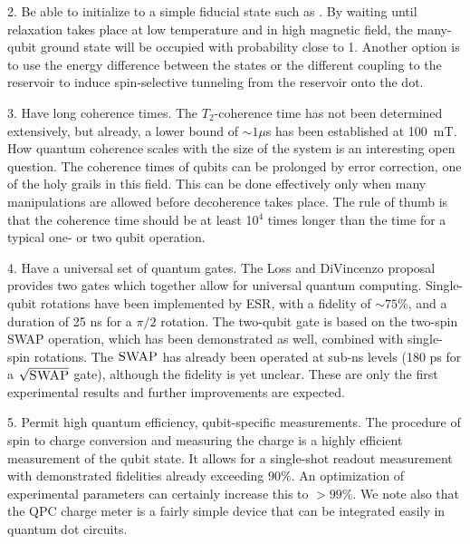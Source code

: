 \documentclass[12pt,aps,nofootinbib]{revtex4-1}
\begin{document}
2. Be able to initialize to a simple fiducial state such as .
By waiting until relaxation takes place at low temperature and in high magnetic field, the many-qubit ground state will be occupied with probability close to 1. Another option is to use the energy difference between the states or the different coupling to the reservoir to induce spin-selective tunneling from the reservoir onto the dot.

3. Have long coherence times. The $T_{2}$-coherence time has not been
determined extensively, but already, a lower bound of $\sim 1 \mu$s has been established at 100~mT. How quantum coherence scales with the size of the system is an interesting open question. The coherence times of qubits can be prolonged by error correction, one of the holy grails in this field. This can be done effectively only when many manipulations are allowed before decoherence takes place. The rule of thumb is that the coherence time should be at least 10$^4$ times longer than the time for a typical one- or two qubit operation.
 
4. Have a universal set of quantum gates. The Loss and DiVincenzo proposal provides two gates which together allow for universal quantum computing. Single-qubit rotations have been implemented by ESR, with a fidelity of $\sim 75\%$, and a duration of 25 ns for a $\pi/2$ rotation. The two-qubit gate is based on the two-spin \mbox{\sc SWAP} operation, which has been demonstrated as well, combined with single-spin rotations. The $\mbox{\sc SWAP}$ has already been operated at sub-ns levels (180 ps for a $\sqrt{\mbox{\sc SWAP}}$ gate), although the fidelity is yet unclear. These are only the first experimental results and further improvements are expected.

5. Permit high quantum efficiency, qubit-specific measurements. The procedure of spin to charge conversion and measuring the charge is a highly efficient measurement of the qubit state. It allows for a single-shot readout measurement with demonstrated fidelities already exceeding $90\%$. An optimization of experimental parameters can certainly increase this to $>99\%$. 
We note also that the QPC charge meter is a fairly
simple device that can be integrated easily in quantum dot
circuits.
\end{document}
